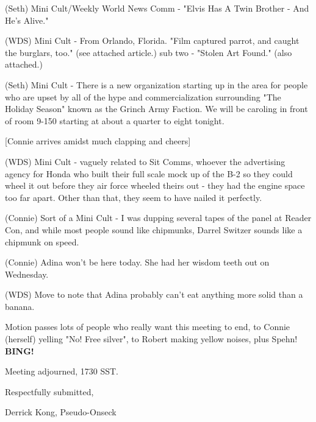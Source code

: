\documentclass[12pt]{article}
\newcommand{\bing}{{\bf BING!} }
\begin{document}
(Seth) Mini Cult/Weekly World News Comm - "Elvis Has A Twin Brother - And He's Alive."

(WDS) Mini Cult - From Orlando, Florida.  "Film captured parrot, and caught the burglars, too." (see attached article.) sub two - "Stolen Art Found." (also attached.)

(Seth) Mini Cult - There is a new organization starting up in the area for people who are upset by all of the hype and commercialization surrounding "The Holiday Season" known as the Grinch Army Faction. We will be caroling in front of room 9-150 starting at about a quarter to eight tonight.

[Connie arrives amidst much clapping and cheers]

(WDS) Mini Cult - vaguely related to Sit Comms, whoever the advertising agency for Honda who built their full scale mock up of the B-2 so they could wheel it out before they air force wheeled theirs out - they had the engine space too far apart. Other than that, they seem to have nailed it perfectly.

(Connie) Sort of a Mini Cult - I was dupping several tapes of the panel at Reader Con, and while most people sound like chipmunks, Darrel Switzer sounds like a chipmunk on speed.

(Connie) Adina won't be here today. She had her wisdom teeth out on Wednesday.

(WDS) Move to note that Adina probably can't eat anything more solid than a banana.

Motion passes lots of people who really want this meeting to end, to Connie (herself) yelling "No! Free silver", to Robert making yellow noises, plus Spehn! \bing

\vspace{12pt}

\noindent
Meeting adjourned, 1730 SST.

\vspace{18pt}

\centerline{Respectfully submitted,}
\centerline{Derrick Kong, Pseudo-Onseck}
\end{document}

